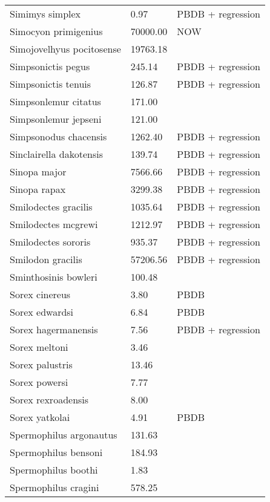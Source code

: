 \documentclass{article}
\begin{document}
\begin{center}
\begin{longtable}{p{} p{} p{}}
    Simimys simplex & 0.97 & PBDB + regression \\ 
    Simocyon primigenius & 70000.00 & NOW \\ 
    Simojovelhyus pocitosense & 19763.18 & \cite{Wang1999} \\ 
    Simpsonictis pegus & 245.14 & PBDB + regression \\ 
    Simpsonictis tenuis & 126.87 & PBDB + regression \\ 
    Simpsonlemur citatus & 171.00 & \cite{Soligo2006} \\ 
    Simpsonlemur jepseni & 121.00 & \cite{Soligo2006} \\ 
    Simpsonodus chacensis & 1262.40 & PBDB + regression \\ 
    Sinclairella dakotensis & 139.74 & PBDB + regression \\ 
    Sinopa major & 7566.66 & PBDB + regression \\ 
    Sinopa rapax & 3299.38 & PBDB + regression \\ 
    Smilodectes gracilis & 1035.64 & PBDB + regression \\ 
    Smilodectes mcgrewi & 1212.97 & PBDB + regression \\ 
    Smilodectes sororis & 935.37 & PBDB + regression \\ 
    Smilodon gracilis & 57206.56 & PBDB + regression \\ 
    Sminthosinis bowleri & 100.48 & \cite{Tomiya2013} \\ 
    Sorex cinereus & 3.80 & PBDB \\ 
    Sorex edwardsi & 6.84 & PBDB \\ 
    Sorex hagermanensis & 7.56 & PBDB + regression \\ 
    Sorex meltoni & 3.46 & \cite{Tomiya2013} \\ 
    Sorex palustris & 13.46 & \cite{Smith2004} \\ 
    Sorex powersi & 7.77 & \cite{Tomiya2013} \\ 
    Sorex rexroadensis & 8.00 & \cite{McKenna2011} \\ 
    Sorex yatkolai & 4.91 & PBDB \\ 
    Spermophilus argonautus & 131.63 & \cite{Tomiya2013} \\ 
    Spermophilus bensoni & 184.93 & \cite{Tomiya2013} \\ 
    Spermophilus boothi & 1.83 & \cite{Secord2008a} \\ 
    Spermophilus cragini & 578.25 & \cite{Tomiya2013} \\ 

\end{longtable}
\end{center}
\end{document}
